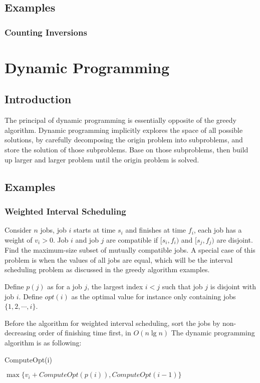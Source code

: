 			\subsection{Examples}
				\subsubsection{Counting Inversions}

		\section{Dynamic Programming}
			\subsection{Introduction}
				The principal of dynamic programming is essentially opposite of the greedy algorithm. Dynamic programming implicitly explores the space of all possible solutions, by carefully decomposing the origin problem into subproblems, and store the solution of those subproblems. Base on those subproblems, then build up larger and larger problem until the origin problem is solved.

			\subsection{Examples}
				\subsubsection{Weighted Interval Scheduling}
					Consider $n$ jobs, job $i$ starts at time $s_i$ and finishes at time $f_i$, each job has a weight of $v_i > 0$. Job $i$ and job $j$ are compatible if $[s_i, f_i)$ and $[s_j, f_j)$ are disjoint. Find the maximum-size subset of mutually compatible jobs. A special case of this problem is when the values of all jobs are equal, which will be the interval scheduling problem as discussed in the greedy algorithm examples.

					Define $p(j)$ as for a job $j$, the largest index $i < j$ such that job $j$ is disjoint with job $i$. Define $opt(i)$ as the optimal value for instance only containing jobs $\{1, 2, \cdots, i\}$.

					Before the algorithm for weighted interval scheduling, sort the jobs by non-decreasing order of finishing time first, in $O(n \lg n)$ The dynamic programming algorithm is as following:
					\begin{algorithm}[h]
						\caption{ComputeOpt(i)}
						\begin{algorithmic}[1]
								\State {}
							\Else
								\State \Return $\max\{v_i + ComputeOpt(p(i)), ComputeOpt(i - 1)\}$
							\EndIf
						\end{algorithmic}
					\end{algorithm}

